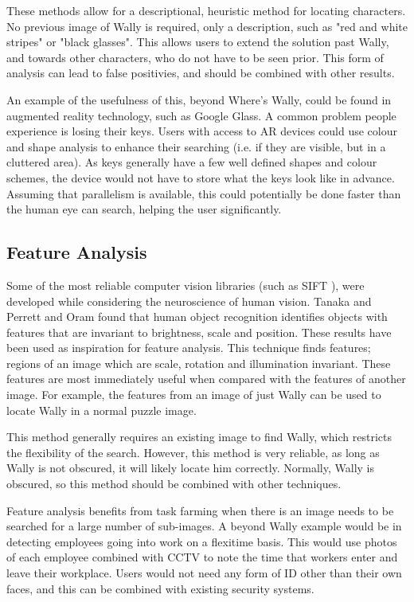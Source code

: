 \documentclass[../main.tex]{subfiles}
\begin{document}
    These methods allow for a descriptional, heuristic method for locating characters.
    No previous image of Wally is required, only a description, such as "red and white stripes" or "black glasses".
    This allows users to extend the solution past Wally, and towards other characters, who do not have to be seen prior.
    This form of analysis can lead to false positivies, and should be combined with other results.

    An example of the usefulness of this, beyond Where's Wally, could be found in augmented reality technology, such as Google Glass.
    A common problem people experience is losing their keys.
    Users with access to AR devices could use colour and shape analysis to enhance their searching (i.e. if they are visible, but in a cluttered area).
    As keys generally have a few well defined shapes and colour schemes, the device would not have to store what the keys look like in advance.
    Assuming that parallelism is available, this could potentially be done faster than the human eye can search, helping the user significantly.
    
    \subsection{Feature Analysis}
    Some of the most reliable computer vision libraries (such as SIFT \cite{sift}), were developed while considering the neuroscience of human vision.
    Tanaka\cite{tanakahv} and Perrett and Oram\cite{perretthv} found that human object recognition identifies objects with features that are invariant to brightness, scale and position.
    These results have been used as inspiration for feature analysis.
    This technique finds features; regions of an image which are scale, rotation and illumination invariant.
    These features are most immediately useful when compared with the features of another image.
    For example, the features from an image of just Wally can be used to locate Wally in a normal puzzle image.

    This method generally requires an existing image to find Wally, which restricts the flexibility of the search.
    However, this method is very reliable, as long as Wally is not obscured, it will likely locate him correctly.
    Normally, Wally is obscured, so this method should be combined with other techniques.

    Feature analysis benefits from task farming when there is an image needs to be searched for a large number of sub-images.
    A beyond Wally example would be in detecting employees going into work on a flexitime basis.
    This would use photos of each employee combined with CCTV to note the time that workers enter and leave their workplace.
    Users would not need any form of ID other than their own faces, and this can be combined with existing security systems.    
\end{document}
